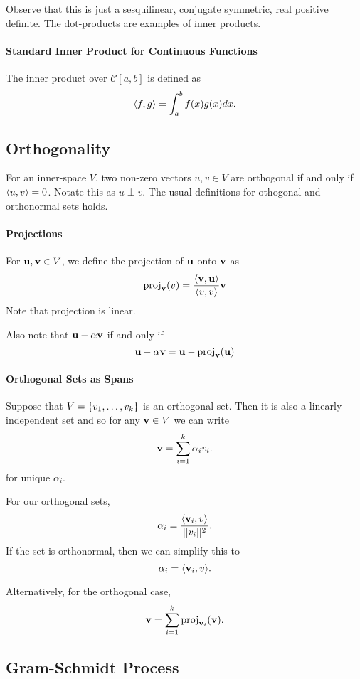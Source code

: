 Observe that this is just a sesquilinear, conjugate symmetric, real positive definite.
The dot-products are examples of inner products.

\paragraph{Standard Inner Product for Continuous Functions}
The inner product over \( \mathcal{C}[a, b] \) is defined as \[
    \langle f, g \rangle = \int_a^b f(x) g(x) dx.
\]

%
%
%
\subsection{Orthogonality}
For an inner-space \( V \), two non-zero vectors \( u, v \in V \) are orthogonal if
and only if \( \langle u, v \rangle = 0 \).
Notate this as \( u \perp v \).
The usual definitions for othogonal and orthonormal sets holds.

\paragraph{Projections}
For \( \mathbf{u}, \mathbf{v} \in V \), we define the projection of \( \mathbf{u} \) onto \( \mathbf{v} \)
as \[
    \mathrm{proj}_{\mathbf{v}}(v) = \dfrac{
        \langle \mathbf{v}, \mathbf{u} \rangle
    }{
        \langle v, v \rangle
    } \mathbf{v}
\]
Note that projection is linear.

Also note that \( \mathbf{u} - \alpha \mathbf{v} \) if and only if \[
    \mathbf{u} - \alpha \mathbf{v} = \mathbf{u} - \mathrm{proj}_{\mathbf{v}}(\mathbf{u})
\]

\paragraph{Orthogonal Sets as Spans}
Suppose that \( V = \left\{ v_1, \dots, v_k \right\} \) is an orthogonal set.
Then it is also a linearly independent set and so for any \( \mathbf{v} \in V \)
we can write \[
    \mathbf{v} = \sum_{i=1}^k \alpha_i v_i. 
\] for unique \( \alpha_i \).

For our orthogonal sets, \[
    \alpha_i = \dfrac{\langle \mathbf{v}_i, v \rangle}{||v_i||^2}.
\]
If the set is orthonormal, then we can simplify this to \[
    \alpha_i = \langle \mathbf{v}_i, v \rangle.
\]

Alternatively, for the orthogonal case, \[
    \mathbf{v} = \sum_{i = 1}^{k} \mathrm{proj}_{\mathbf{v}_i}(\mathbf{v}).
\]

\subsection{Gram-Schmidt Process}

